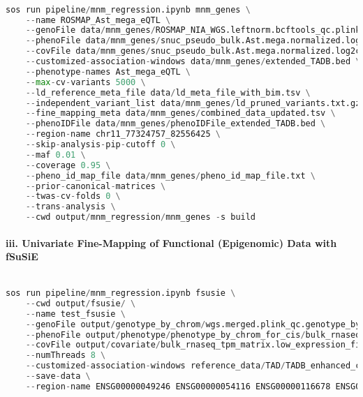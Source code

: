 \documentclass[12pt]{article}
\begin{document}
\noindent
\begin{lstlisting}[language=Python]

sos run pipeline/mnm_regression.ipynb mnm_genes \
    --name ROSMAP_Ast_mega_eQTL \
    --genoFile data/mnm_genes/ROSMAP_NIA_WGS.leftnorm.bcftools_qc.plink_qc.11.bed \
    --phenoFile data/mnm_genes/snuc_pseudo_bulk.Ast.mega.normalized.log2cpm.region_list.txt \
    --covFile data/mnm_genes/snuc_pseudo_bulk.Ast.mega.normalized.log2cpm.rosmap_cov.ROSMAP_NIA_WGS.leftnorm.bcftools_qc.plink_qc.snuc_pseudo_bulk_mega.related.plink_qc.extracted.pca.projected.Marchenko_PC.gz \
    --customized-association-windows data/mnm_genes/extended_TADB.bed \
    --phenotype-names Ast_mega_eQTL \
    --max-cv-variants 5000 \
    --ld_reference_meta_file data/ld_meta_file_with_bim.tsv \
    --independent_variant_list data/mnm_genes/ld_pruned_variants.txt.gz \
    --fine_mapping_meta data/mnm_genes/combined_data_updated.tsv \
    --phenoIDFile data/mnm_genes/phenoIDFile_extended_TADB.bed \
    --region-name chr11_77324757_82556425 \
    --skip-analysis-pip-cutoff 0 \
    --maf 0.01 \
    --coverage 0.95 \
    --pheno_id_map_file data/mnm_genes/pheno_id_map_file.txt \
    --prior-canonical-matrices \
    --twas-cv-folds 0 \
    --trans-analysis \
    --cwd output/mnm_regression/mnm_genes -s build

\end{lstlisting}




\paragraph*{iii. Univariate Fine-Mapping of Functional (Epigenomic) Data with fSuSiE}


\noindent
\begin{lstlisting}[language=Python]

sos run pipeline/mnm_regression.ipynb fsusie \
    --cwd output/fsusie/ \
    --name test_fsusie \
    --genoFile output/genotype_by_chrom/wgs.merged.plink_qc.genotype_by_chrom_files.txt \
    --phenoFile output/phenotype/phenotype_by_chrom_for_cis/bulk_rnaseq.phenotype_by_chrom_files.region_list.txt \
    --covFile output/covariate/bulk_rnaseq_tpm_matrix.low_expression_filtered.outlier_removed.tmm.expression.covariates.wgs.merged.plink_qc.plink_qc.prune.pca.Marchenko_PC.gz \
    --numThreads 8 \
    --customized-association-windows reference_data/TAD/TADB_enhanced_cis.bed \
    --save-data \
    --region-name ENSG00000049246 ENSG00000054116 ENSG00000116678 ENSG00000073921 ENSG00000186891

\end{lstlisting}
\end{document}
